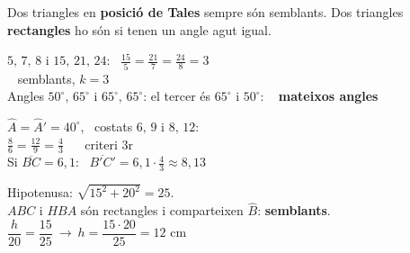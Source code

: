 \documentclass[11pt,a4paper]{article}
\newcommand{\heavy}{\fontseries{eb}\selectfont}
\newcommand{\be}[1]{{\color{fmok}\faCheckCircle}\ \ensuremath{#1}}
\begin{document}
\vfill
{\large Dos triangles en \textbf{posició de Tales} sempre són semblants. Dos triangles \textbf{rectangles} ho són si tenen un angle agut igual.}

\vfill
\begin{exemple}[Exemples]
\begin{minipage}[t]{0.48\linewidth}
$5,\,7,\,8$ i $15,\,21,\,24$: \ $\frac{15}{5}=\frac{21}{7}=\frac{24}{8}=3$\\ \be{} semblants, $\boxed{k=3}$\\[5pt]
Angles $50^\circ,\,65^\circ$ i $65^\circ,\,65^\circ$: el tercer és $65^\circ$ i $50^\circ$: \be{} \textbf{mateixos angles}
\end{minipage}\hfill
\begin{minipage}[t]{0.49\linewidth}
$\hat A=\hat A'=40^\circ$, \ costats $6,\,9$ i $8,\,12$:\\
$\frac86=\frac{12}{9}=\frac43$ \ \be{} criteri 3r\\[3pt]
Si $\overline{BC}=6{,}1$: \ $\overline{B'C'}=6{,}1\cdot\frac43\approx\boxed{8{,}13}$
\end{minipage}
\end{exemple}

\vfill
\begin{exemple}
\begin{minipage}[c]{0.6\linewidth}
Hipotenusa: $\sqrt{15^2+20^2}=25$.\\[3pt]
$ABC$ i $HBA$ són rectangles i comparteixen $\hat B$: \textbf{semblants}.\\[3pt]
$\dfrac{h}{20}=\dfrac{15}{25}\ \to\ h=\dfrac{15\cdot20}{25}=\boxed{12\text{ cm}}$
\end{minipage}\hfill
\begin{minipage}[c]{0.36\linewidth}\centering
{}
\end{minipage}
\end{exemple}
\end{document}
